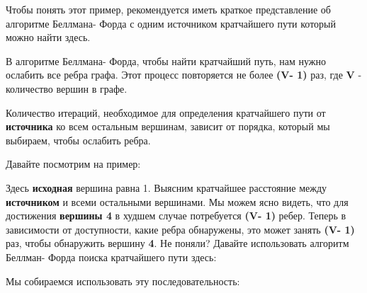 Чтобы понять этот пример, рекомендуется иметь краткое представление об алгоритме Беллмана- Форда с одним источником кратчайшего пути который можно найти здесь.

\vspace{\baselineskip}

В алгоритме Беллмана- Форда, чтобы найти кратчайший путь, нам нужно ослабить все ребра графа. Этот процесс повторяется не более \textbf{(V- 1)} раз, где \textbf{V} -  количество вершин в графе.

\vspace{\baselineskip}

Количество итераций, необходимое для определения кратчайшего пути от \textbf{источника} ко всем остальным вершинам, зависит от порядка, который мы выбираем, чтобы ослабить ребра.

\vspace{\baselineskip}

Давайте посмотрим на пример:


Здесь \textbf{исходная} вершина равна 1. Выясним кратчайшее расстояние между \textbf{источником} и всеми остальными вершинами. Мы можем ясно видеть, что для достижения \textbf{вершины 4} в худшем случае потребуется \textbf{(V- 1)} ребер. Теперь в зависимости от доступности, какие ребра обнаружены, это может занять \textbf{(V- 1)} раз, чтобы обнаружить вершину \textbf{4}. Не поняли? Давайте использовать алгоритм Беллман- Форда поиска кратчайшего пути здесь:

\vspace{\baselineskip}

Мы собираемся использовать эту последовательность:

